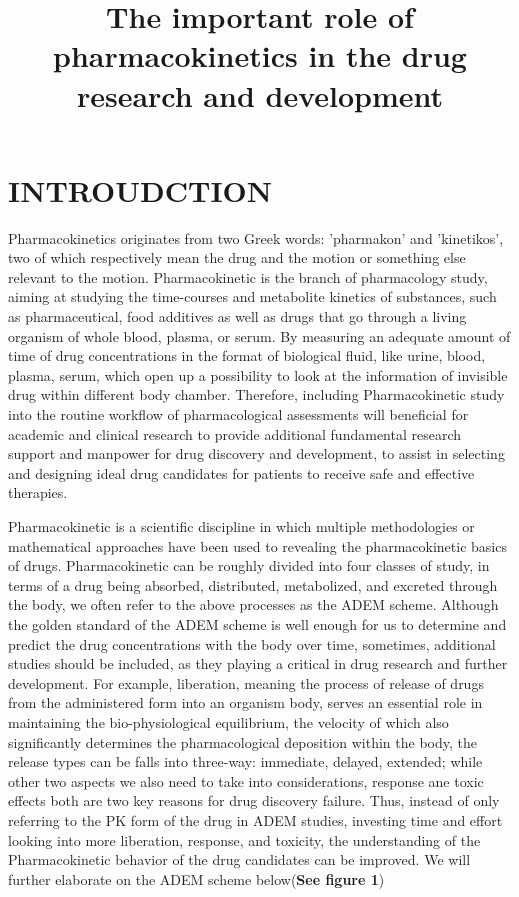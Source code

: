 \documentclass[12pt]{article}
\begin{document}
  
\title{\large The important role of pharmacokinetics in the drug research and development \vspace{-2em}}
\date{\vspace{-2.5em}}
\maketitle

\section{INTROUDCTION}
Pharmacokinetics originates from two Greek words: 'pharmakon' and 'kinetikos', two of which respectively mean the drug and the motion or something else relevant to the motion. Pharmacokinetic is the branch of pharmacology study, aiming at studying the time-courses and metabolite kinetics of substances, such as pharmaceutical, food additives as well as drugs that go through a living organism of whole blood, plasma, or serum. By measuring an adequate amount of time of drug concentrations in the format of biological fluid, like urine, blood, plasma, serum, which open up a possibility to look at the information of invisible drug within different body chamber. Therefore, including Pharmacokinetic study into the routine workflow of pharmacological assessments will beneficial for academic and clinical research to provide additional fundamental research support and manpower for drug discovery and development,  to assist in selecting and designing ideal drug candidates for patients to receive safe and effective therapies. \medskip

Pharmacokinetic is a scientific discipline in which multiple methodologies or mathematical approaches have been used to revealing the pharmacokinetic basics of drugs. Pharmacokinetic can be roughly divided into four classes of study, in terms of a drug being absorbed, distributed, metabolized, and excreted through the body, we often refer to the above processes as the ADEM scheme. Although the golden standard of the ADEM scheme is well enough for us to determine and predict the drug concentrations with the body over time, sometimes, additional studies should be included, as they playing a critical in drug research and further development. For example, liberation, meaning the process of release of drugs from the administered form into an organism body, serves an essential role in maintaining the bio-physiological equilibrium, the velocity of which also significantly determines the pharmacological deposition within the body, the release types can be falls into three-way: immediate, delayed, extended; while other two aspects we also need to take into considerations, response ane toxic effects both are two key reasons for drug discovery failure. Thus, instead of only referring to the PK form of the drug in ADEM studies, investing time and effort looking into more liberation, response, and toxicity, the understanding of the Pharmacokinetic behavior of the drug candidates can be improved. We will further elaborate on the ADEM scheme below(\textbf{See figure 1})\medskip
\end{document}
